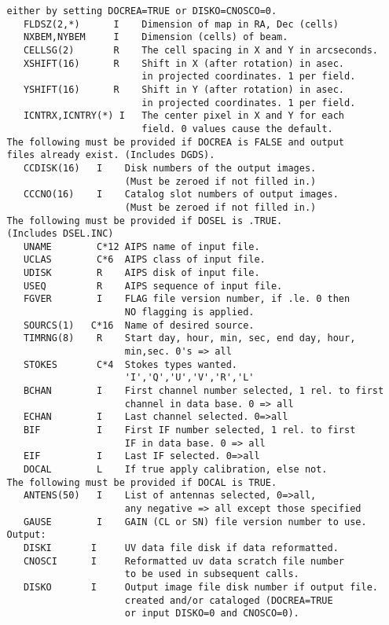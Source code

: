 \begin{verbatim}
   either by setting DOCREA=TRUE or DISKO=CNOSCO=0.
      FLDSZ(2,*)      I    Dimension of map in RA, Dec (cells)
      NXBEM,NYBEM     I    Dimension (cells) of beam.
      CELLSG(2)       R    The cell spacing in X and Y in arcseconds.
      XSHIFT(16)      R    Shift in X (after rotation) in asec.
                           in projected coordinates. 1 per field.
      YSHIFT(16)      R    Shift in Y (after rotation) in asec.
                           in projected coordinates. 1 per field.
      ICNTRX,ICNTRY(*) I   The center pixel in X and Y for each
                           field. 0 values cause the default.
   The following must be provided if DOCREA is FALSE and output
   files already exist. (Includes DGDS).
      CCDISK(16)   I    Disk numbers of the output images.
                        (Must be zeroed if not filled in.)
      CCCNO(16)    I    Catalog slot numbers of output images.
                        (Must be zeroed if not filled in.)
   The following must be provided if DOSEL is .TRUE.
   (Includes DSEL.INC)
      UNAME        C*12 AIPS name of input file.
      UCLAS        C*6  AIPS class of input file.
      UDISK        R    AIPS disk of input file.
      USEQ         R    AIPS sequence of input file.
      FGVER        I    FLAG file version number, if .le. 0 then
                        NO flagging is applied.
      SOURCS(1)   C*16  Name of desired source.
      TIMRNG(8)    R    Start day, hour, min, sec, end day, hour,
                        min,sec. 0's => all
      STOKES       C*4  Stokes types wanted.
                        'I','Q','U','V','R','L'
      BCHAN        I    First channel number selected, 1 rel. to first
                        channel in data base. 0 => all
      ECHAN        I    Last channel selected. 0=>all
      BIF          I    First IF number selected, 1 rel. to first
                        IF in data base. 0 => all
      EIF          I    Last IF selected. 0=>all
      DOCAL        L    If true apply calibration, else not.
   The following must be provided if DOCAL is TRUE.
      ANTENS(50)   I    List of antennas selected, 0=>all,
                        any negative => all except those specified
      GAUSE        I    GAIN (CL or SN) file version number to use.
   Output:
      DISKI       I     UV data file disk if data reformatted.
      CNOSCI      I     Reformatted uv data scratch file number
                        to be used in subsequent calls.
      DISKO       I     Output image file disk number if output file.
                        created and/or cataloged (DOCREA=TRUE
                        or input DISKO=0 and CNOSCO=0).

\end{verbatim}
